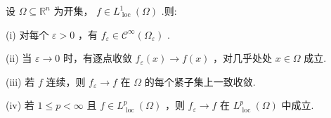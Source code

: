 \begin{theorem}[磨光核的性质]\label{thm:app-A-16}
设 $\Omega  \subseteq  {\mathbb{R}}^{n}$ 为开集， $f \in  {L}_{\text{ loc }}^{1}\left( \Omega \right)$ .则:

(i) 对每个 $\varepsilon  > 0$ ，有 ${f}_{\varepsilon } \in  {\mathcal{C}}^{\infty }\left( {\Omega }_{\varepsilon }\right)$ .

(ii) 当 $\varepsilon  \rightarrow  0$ 时，有逐点收敛 ${f}_{\varepsilon }\left( x\right)  \rightarrow  f\left( x\right)$ ，对几乎处处 $x \in  \Omega$ 成立.

(iii) 若 $f$ 连续，则 ${f}_{\varepsilon } \rightarrow  f$ 在 $\Omega$ 的每个紧子集上一致收敛.

(iv) 若 $1 \leq  p < \infty$ 且 $f \in  {L}_{\text{ loc }}^{p}\left( \Omega \right)$ ，则 ${f}_{\varepsilon } \rightarrow  f$ 在 ${L}_{\text{ loc }}^{p}\left( \Omega \right)$ 中成立.
\end{theorem}

